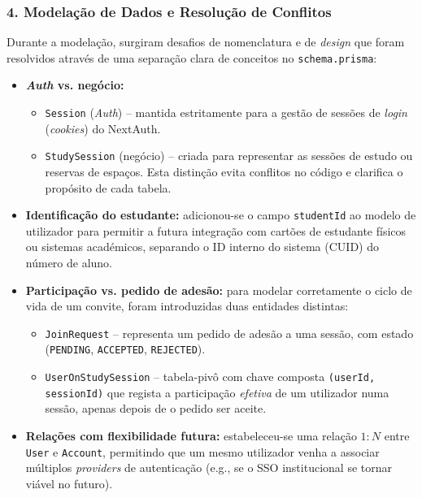 \documentclass[11pt,a4paper]{article}
\begin{document}
\subsubsection{4. Modelação de Dados e Resolução de Conflitos}

Durante a modelação, surgiram desafios de nomenclatura e de \emph{design} que
foram resolvidos através de uma separação clara de conceitos no
\texttt{schema.prisma}:

\begin{itemize}[leftmargin=*]
    \item \textbf{\emph{Auth} vs. negócio:}
          \begin{itemize}
              \item \texttt{Session} (\emph{Auth}) -- mantida estritamente para a
                    gestão de sessões de \emph{login} (\emph{cookies}) do NextAuth.
              \item \texttt{StudySession} (negócio) -- criada para representar as
                    sessões de estudo ou reservas de espaços. Esta distinção evita
                    conflitos no código e clarifica o propósito de cada tabela.
          \end{itemize}
    \item \textbf{Identificação do estudante:} adicionou-se o campo
          \texttt{studentId} ao modelo de utilizador para permitir a futura
          integração com cartões de estudante físicos ou sistemas académicos,
          separando o ID interno do sistema (CUID) do número de aluno.
    \item \textbf{Participação vs. pedido de adesão:} para modelar corretamente
          o ciclo de vida de um convite, foram introduzidas duas entidades
          distintas:
          \begin{itemize}
              \item \texttt{JoinRequest} -- representa um pedido de adesão a uma
                    sessão, com estado (\texttt{PENDING}, \texttt{ACCEPTED},
                    \texttt{REJECTED}).
              \item \texttt{UserOnStudySession} -- tabela-pivô com chave composta
                    \texttt{(userId, sessionId)} que regista a participação
                    \emph{efetiva} de um utilizador numa sessão, apenas depois de o
                    pedido ser aceite.
          \end{itemize}
    \item \textbf{Relações com flexibilidade futura:} estabeleceu-se uma relação
          $1{:}N$ entre \texttt{User} e \texttt{Account}, permitindo que um mesmo
          utilizador venha a associar múltiplos \emph{providers} de autenticação
          (e.g., se o SSO institucional se tornar viável no futuro).
\end{itemize}
\end{document}
